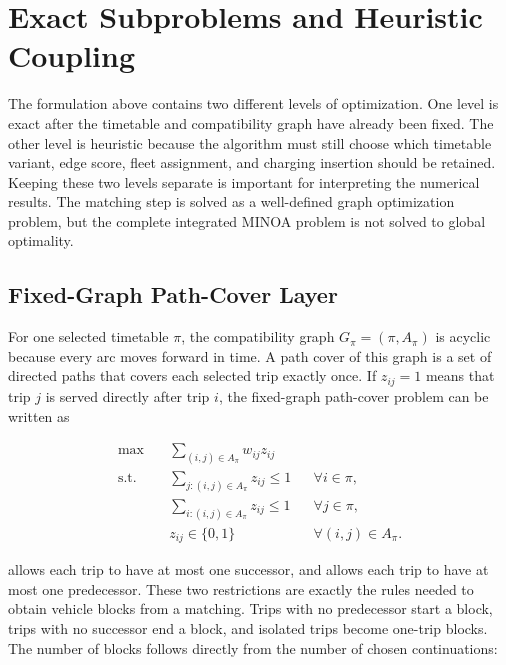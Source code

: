 \section{Exact Subproblems and Heuristic Coupling}
\label{sec:exact-subproblems-heuristic-coupling}

The formulation above contains two different levels of optimization.  One level
is exact after the timetable and compatibility graph have already been fixed.
The other level is heuristic because the algorithm must still choose which
timetable variant, edge score, fleet assignment, and charging insertion should
be retained.  Keeping these two levels separate is important for interpreting
the numerical results.  The matching step is solved as a well-defined graph
optimization problem, but the complete integrated MINOA problem is not solved to
global optimality.

\subsection{Fixed-Graph Path-Cover Layer}
\label{subsec:fixed-graph-path-cover-layer}

For one selected timetable \(\pi\), the compatibility graph
\(G_\pi=(\pi,A_\pi)\) is acyclic because every arc moves forward in time.  A
path cover of this graph is a set of directed paths that covers each selected
trip exactly once.  If \(z_{ij}=1\) means that trip \(j\) is served directly
after trip \(i\), the fixed-graph path-cover problem can be written as

\begin{align}
\max \quad
& \sum_{(i,j)\in A_\pi} w_{ij}z_{ij}
\label{eq:fixed-graph-path-cover}\\
\text{s.t.}\quad
& \sum_{j:(i,j)\in A_\pi} z_{ij}\le 1
&& \forall i\in\pi,
\label{eq:fixed-graph-successor}\\
& \sum_{i:(i,j)\in A_\pi} z_{ij}\le 1
&& \forall j\in\pi,
\label{eq:fixed-graph-predecessor}\\
& z_{ij}\in\{0,1\}
&& \forall (i,j)\in A_\pi .
\label{eq:fixed-graph-binary}
\end{align}

 allows each trip to have at most one successor,
and  allows each trip to have at most one
predecessor.  These two restrictions are exactly the rules needed to obtain
vehicle blocks from a matching.  Trips with no predecessor start a block, trips
with no successor end a block, and isolated trips become one-trip blocks.  The
number of blocks follows directly from the number of chosen continuations:

